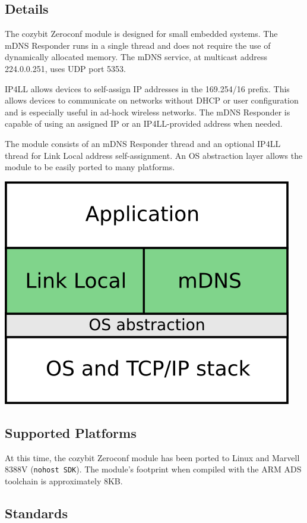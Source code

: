 \documentclass[12pt,landscape,twocolumn]{article}
\begin{document}
\subsection*{Details}

The cozybit Zeroconf module is designed for small embedded systems.  The mDNS 
Responder runs in a single thread and does not require the use of dynamically 
allocated memory.  The mDNS service, at multicast address 224.0.0.251, uses 
UDP port 5353.

IP4LL allows devices to self-assign IP addresses in the 169.254/16 prefix. 
This allows devices to communicate on networks without DHCP or user 
configuration and is especially useful in ad-hock wireless networks.  The mDNS
Responder is capable of using an assigned IP or an IP4LL-provided address when
needed.

The module consists of an mDNS Responder thread and an optional IP4LL thread 
for Link Local address self-assignment.  An OS abstraction layer allows the 
module to be easily ported to many platforms.

\begin{center}
\includegraphics[width=40ex]{./figures/arch.png}
\end{center}

\subsection*{Supported Platforms}

At this time, the cozybit Zeroconf module has been ported to Linux and
Marvell 8388V ({\tt nohost SDK}).  The module's footprint when compiled with
the ARM ADS toolchain is approximately 8KB.

\pagebreak
\subsection*{Standards}
\end{document}
